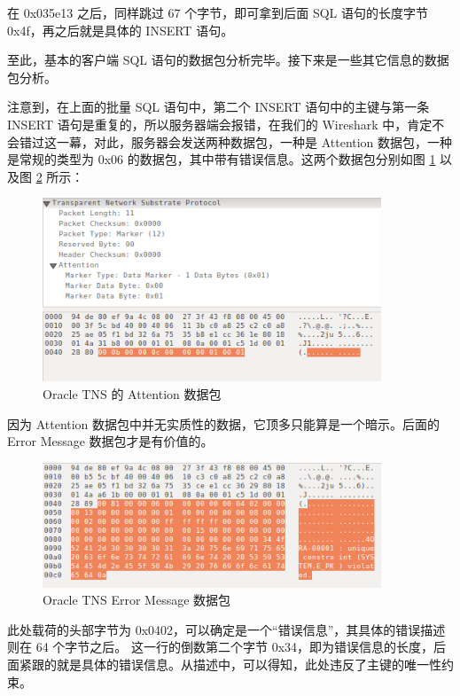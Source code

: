 在 {\cf 0x035e13} 之后，同样跳过 67 个字节，即可拿到后面 SQL 语句的长度字节 {\cf 0x4f}，再之后就是具体的 {\cf INSERT} 语句。

至此，基本的客户端 SQL 语句的数据包分析完毕。接下来是一些其它信息的数据包分析。

注意到，在上面的批量 SQL 语句中，第二个 {\cf INSERT} 语句中的主键与第一条 {\cf INSERT} 语句是重复的，所以服务器端会报错，在我们的 Wireshark 中，肯定不会错过这一幕，对此，服务器会发送两种数据包，一种是 {\cf Attention} 数据包，一种是常规的类型为 {\cf 0x06} 的数据包，其中带有错误信息。这两个数据包分别如图 \ref{fig:tns-attention} 以及图 \ref{fig:tns-error-msg} 所示：

\begin{figure}[ht!]
    \caption{Oracle TNS 的 Attention 数据包}
    \label{fig:tns-attention}
    \centering
    \includegraphics[width=0.9\textwidth]{tns-attention.png}
\end{figure}

因为 Attention 数据包中并无实质性的数据，它顶多只能算是一个暗示。后面的 Error Message 数据包才是有价值的。

\begin{figure}[ht!]
    \caption{Oracle TNS Error Message 数据包}
    \label{fig:tns-error-msg}
    \centering
    \includegraphics[width=0.9\textwidth]{tns-error-msg.png}
\end{figure}

此处载荷的头部字节为 {\cf 0x0402}，可以确定是一个``错误信息''，其具体的错误描述则在 64 个字节之后。 {} 这一行的倒数第二个字节 {\cf 0x34}，即为错误信息的长度，后面紧跟的就是具体的错误信息。从描述中，可以得知，此处违反了主键的唯一性约束。

